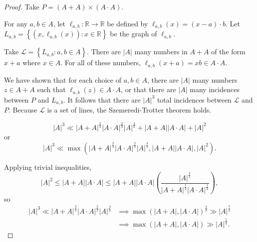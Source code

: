 \documentclass[12pt]{amsart}
\begin{document}
\begin{proof}
Take \(P = \left( A + A \right) \times \left( A \cdot A \right) \). 

For any \(a,b \in A\), let \(\ell _{a,b} : \mathbb{R} \to \mathbb{R} \) be defined by
\(\ell _{a,b} (x) = (x-a)\cdot b\). Let \(L_{a,b} = \left\{ (x, \ell _{a,b} (x)) : x \in \mathbb{R}  \right\} \)
be the graph of \(\ell _{a,b} \).

Take \(\mathcal{L} = \left\{ L_{a,b} : a,b \in A \right\} \). There are \(\left\lvert A \right\rvert \) many numbers in
\(A + A\) of the form \(x + a\) where \(x \in A\). For all of these numbers, \(\ell _{a,b} (x + a) = xb \in A\cdot A\).

We have shown that for each choice of \(a,b \in A\), there are \(\left\lvert A \right\rvert \) many numbers
\(z \in A+A\) such that \(\ell _{a,b} (z) \in A\cdot A\), or that there are \(\left\lvert A \right\rvert \) many
incidences between \(P\) and \(L_{a,b} \). It follows that there are \(\left\lvert A \right\rvert ^{3} \) total incidences
between \(\mathcal{L} \) and \(P\). Because \(\mathcal{L} \) is a set of lines, the Szemeredi-Trotter theorem holds.

\[
    \left\lvert A \right\rvert ^{3} \ll \left\lvert A + A \right\rvert ^{\frac{2}{3} } \left\lvert A \cdot A \right\rvert ^{\frac{2}{3} } \left\lvert A \right\rvert ^{\frac{4}{3} } + \left\lvert A + A \right\rvert \left\lvert A \cdot A \right\rvert + \left\lvert A \right\rvert ^{2}
\]
or
\[
    \left\lvert A \right\rvert ^{3} \ll \max \left( \left\lvert A + A \right\rvert ^{\frac{2}{3} } \left\lvert A \cdot A \right\rvert ^{\frac{2}{3} } \left\lvert A \right\rvert ^{\frac{4}{3} } , \left\lvert A + A \right\rvert \left\lvert A \cdot A \right\rvert , \left\lvert A \right\rvert ^{2} \right) 
.\]

Applying trivial inequalities,
\[
    \left\lvert A \right\rvert ^{2} \leq \left\lvert A+A \right\rvert \left\lvert A \cdot A \right\rvert \leq \left\lvert A+A \right\rvert \left\lvert A \cdot A \right\rvert \left( \frac{\left\lvert A \right\rvert ^{\frac{4}{3} }}{\left\lvert A+A \right\rvert ^{\frac{1}{3} }\left\lvert A \cdot A \right\rvert ^{\frac{1}{3} }}  \right) 
,\]
so
\begin{align*}
    \left\lvert A \right\rvert ^{3} \ll \left\lvert A+A \right\rvert ^{\frac{2}{3} }\left\lvert A \cdot A \right\rvert ^{\frac{2}{3} } \left\lvert A \right\rvert ^{\frac{4}{3} } & \implies \max \left( \left\lvert A + A \right\rvert , \left\lvert A \cdot A \right\rvert  \right) ^{\frac{4}{3} } \gg \left\lvert A \right\rvert ^{\frac{5}{3} } \\
    & \implies \max \left( \left\lvert A + A \right\rvert , \left\lvert A \cdot A \right\rvert  \right) \gg \left\lvert A \right\rvert ^{\frac{5}{4} }.
\end{align*}

\end{proof}
\end{document}
